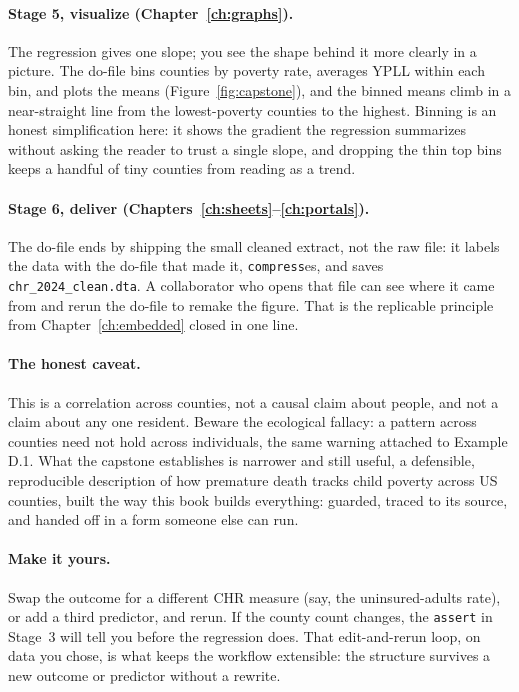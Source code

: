 \documentclass[
    a4paper,
    fontsize=10pt,
    twoside=true,
    numbers=noenddot,
]{kaobook}
\begin{document}
\paragraph{Stage 5, visualize (Chapter~\ref{ch:graphs}).} The regression gives one slope; you see the shape behind it more clearly in a picture. The do-file bins counties by poverty rate, averages YPLL within each bin, and plots the means (Figure~\ref{fig:capstone}), and the binned means climb in a near-straight line from the lowest-poverty counties to the highest. Binning is an honest simplification here: it shows the gradient the regression summarizes without asking the reader to trust a single slope, and dropping the thin top bins keeps a handful of tiny counties from reading as a trend.

\paragraph{Stage 6, deliver (Chapters~\ref{ch:sheets}--\ref{ch:portals}).} The do-file ends by shipping the small cleaned extract, not the raw file: it labels the data with the do-file that made it, \texttt{compress}es, and saves \texttt{chr\_2024\_clean.dta}. A collaborator who opens that file can see where it came from and rerun the do-file to remake the figure. That is the replicable principle from Chapter~\ref{ch:embedded} closed in one line.

\paragraph{The honest caveat.} This is a correlation across counties, not a causal claim about people, and not a claim about any one resident. Beware the ecological fallacy: a pattern across counties need not hold across individuals, the same warning attached to Example D.1. What the capstone establishes is narrower and still useful, a defensible, reproducible description of how premature death tracks child poverty across US counties, built the way this book builds everything: guarded, traced to its source, and handed off in a form someone else can run.

\paragraph{Make it yours.} Swap the outcome for a different CHR measure (say, the uninsured-adults rate), or add a third predictor, and rerun. If the county count changes, the \texttt{assert} in Stage~3 will tell you before the regression does. That edit-and-rerun loop, on data you chose, is what keeps the workflow extensible: the structure survives a new outcome or predictor without a rewrite.
\end{document}
